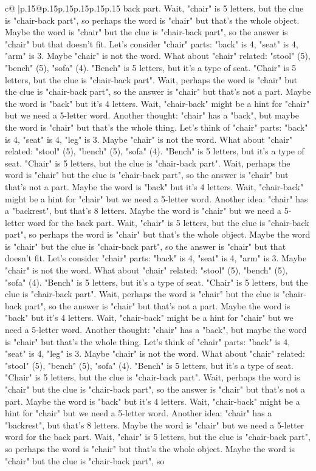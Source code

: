 \documentclass{article}
\begin{document}
{\begin{supertabular}{c@{$\;$}|p{.15\linewidth}@{}p{.15\linewidth}p{.15\linewidth}p{.15\linewidth}p{.15\linewidth}p{.15\linewidth}}
{{{back part. Wait, "chair" is 5 letters, but the clue is "chair{-}back part", so perhaps the word is "chair" but that's the whole object. Maybe the word is "chair" but the clue is "chair{-}back part", so the answer is "chair" but that doesn't fit. Let's consider "chair" parts: "back" is 4, "seat" is 4, "arm" is 3. Maybe "chair" is not the word. What about "chair" related: "stool" (5), "bench" (5), "sofa" (4). "Bench" is 5 letters, but it's a type of seat. "Chair" is 5 letters, but the clue is "chair{-}back part". Wait, perhaps the word is "chair" but the clue is "chair{-}back part", so the answer is "chair" but that's not a part. Maybe the word is "back" but it's 4 letters. Wait, "chair{-}back" might be a hint for "chair" but we need a 5{-}letter word. Another thought: "chair" has a "back", but maybe the word is "chair" but that's the whole thing. Let's think of "chair" parts: "back" is 4, "seat" is 4, "leg" is 3. Maybe "chair" is not the word. What about "chair" related: "stool" (5), "bench" (5), "sofa" (4). "Bench" is 5 letters, but it's a type of seat. "Chair" is 5 letters, but the clue is "chair{-}back part". Wait, perhaps the word is "chair" but the clue is "chair{-}back part", so the answer is "chair" but that's not a part. Maybe the word is "back" but it's 4 letters. Wait, "chair{-}back" might be a hint for "chair" but we need a 5{-}letter word. Another idea: "chair" has a "backrest", but that's 8 letters. Maybe the word is "chair" but we need a 5{-}letter word for the back part. Wait, "chair" is 5 letters, but the clue is "chair{-}back part", so perhaps the word is "chair" but that's the whole object. Maybe the word is "chair" but the clue is "chair{-}back part", so the answer is "chair" but that doesn't fit. Let's consider "chair" parts: "back" is 4, "seat" is 4, "arm" is 3. Maybe "chair" is not the word. What about "chair" related: "stool" (5), "bench" (5), "sofa" (4). "Bench" is 5 letters, but it's a type of seat. "Chair" is 5 letters, but the clue is "chair{-}back part". Wait, perhaps the word is "chair" but the clue is "chair{-}back part", so the answer is "chair" but that's not a part. Maybe the word is "back" but it's 4 letters. Wait, "chair{-}back" might be a hint for "chair" but we need a 5{-}letter word. Another thought: "chair" has a "back", but maybe the word is "chair" but that's the whole thing. Let's think of "chair" parts: "back" is 4, "seat" is 4, "leg" is 3. Maybe "chair" is not the word. What about "chair" related: "stool" (5), "bench" (5), "sofa" (4). "Bench" is 5 letters, but it's a type of seat. "Chair" is 5 letters, but the clue is "chair{-}back part". Wait, perhaps the word is "chair" but the clue is "chair{-}back part", so the answer is "chair" but that's not a part. Maybe the word is "back" but it's 4 letters. Wait, "chair{-}back" might be a hint for "chair" but we need a 5{-}letter word. Another idea: "chair" has a "backrest", but that's 8 letters. Maybe the word is "chair" but we need a 5{-}letter word for the back part. Wait, "chair" is 5 letters, but the clue is "chair{-}back part", so perhaps the word is "chair" but that's the whole object. Maybe the word is "chair" but the clue is "chair{-}back part", so }}}
\end{supertabular}}
\end{document}
